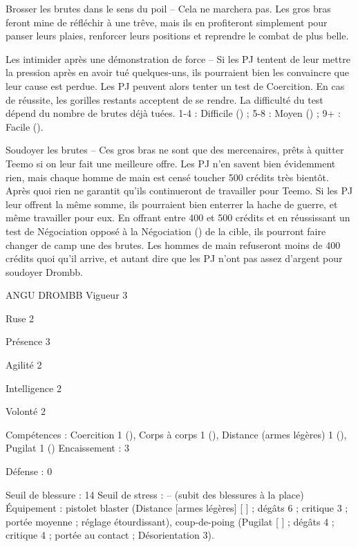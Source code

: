 \documentclass[a4paper,10pt,twoside,twocolumn,openany]{book}
\begin{document}
Brosser les brutes dans le sens du poil – Cela ne
marchera pas. Les gros bras feront mine de réfléchir à
une trêve, mais ils en profiteront simplement pour panser leurs plaies, renforcer leurs positions et reprendre le
combat de plus belle.

Les intimider après une démonstration de force
– Si les PJ tentent de leur mettre la pression après en
avoir tué quelques-uns, ils pourraient bien les convaincre
que leur cause est perdue. Les PJ peuvent alors tenter
un test de Coercition. En cas de réussite, les gorilles restants acceptent de se rendre. La difficulté du test dépend
du nombre de brutes déjà tuées. 1-4 : Difficile (\difficulty \difficulty \difficulty) ;
5-8 : Moyen (\difficulty \difficulty) ; 9+ : Facile (\difficulty).

Soudoyer les brutes – Ces gros bras ne sont que
des mercenaires, prêts à quitter Teemo si on leur fait une
meilleure offre. Les PJ n’en savent bien évidemment rien,
mais chaque homme de main est censé toucher 500
crédits très bientôt. Après quoi rien ne garantit qu’ils continueront de travailler pour Teemo. Si les PJ leur offrent la même somme, ils pourraient bien enterrer la
hache de guerre, et même travailler pour eux. En offrant
entre 400 et 500 crédits et en réussissant un test de
Négociation opposé à la Négociation (\difficulty) de la cible,
ils pourront faire changer de camp une des brutes. Les
hommes de main refuseront moins de 400 crédits quoi
qu’il arrive, et autant dire que les PJ n’ont pas assez
d’argent pour soudoyer Drombb.

\begin{monsterbox}
  
ANGU DROMBB
Vigueur 3

Ruse 2

Présence 3

Agilité 2

Intelligence 2

Volonté 2

Compétences : Coercition 1 (\difficulty \proficiency), Corps à corps 1
(\difficulty \difficulty \proficiency), Distance (armes légères) 1 (\difficulty \proficiency), Pugilat 1
(\difficulty \difficulty \proficiency)
Encaissement : 3

Défense : 0

Seuil de blessure : 14
Seuil de stress : – (subit des blessures à la place)
Équipement : pistolet blaster (Distance [armes
légères] [ \difficulty \proficiency ] ; dégâts 6 ; critique 3 ; portée
moyenne ; réglage étourdissant), coup-de-poing
(Pugilat [ \difficulty \difficulty \proficiency ] ; dégâts 4 ; critique 4 ; portée au
contact ; Désorientation 3).
\end{monsterbox}
\end{document}
